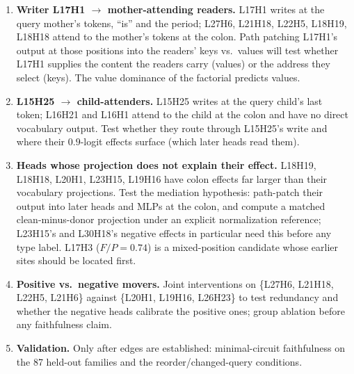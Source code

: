 \documentclass[11pt,a4paper]{article}
\begin{document}
\begin{enumerate}
\item \textbf{Writer L17H1 $\rightarrow$ mother-attending readers.} L17H1 writes at
the query mother's tokens, ``is'' and the period; L27H6, L21H18, L22H5, L18H19,
L18H18 attend to the mother's tokens at the colon. Path patching L17H1's output at
those positions into the readers' keys vs.\ values will test whether L17H1 supplies the
content the readers carry (values) or the address they select (keys). The value
dominance of the factorial predicts values.
\item \textbf{L15H25 $\rightarrow$ child-attenders.} L15H25 writes at the query child's
last token; L16H21 and L16H1 attend to the child at the colon and have no direct
vocabulary output. Test whether they route through L15H25's write and where their
$0.9$-logit effects surface (which later heads read them).
\item \textbf{Heads whose projection does not explain their effect.} L18H19, L18H18,
L20H1, L23H15, L19H16 have colon effects far larger than their vocabulary projections.
Test the mediation hypothesis: path-patch their output into later heads and MLPs at the
colon, and compute a matched clean-minus-donor projection under an explicit
normalization reference; L23H15's and L30H18's negative effects in particular need this
before any type label. L17H3 ($F/P=0.74$) is a mixed-position candidate whose earlier
sites should be located first.
\item \textbf{Positive vs.\ negative movers.} Joint interventions on \{L27H6, L21H18,
L22H5, L21H6\} against \{L20H1, L19H16, L26H23\} to test redundancy and whether the
negative heads calibrate the positive ones; group ablation before any faithfulness
claim.
\item \textbf{Validation.} Only after edges are established: minimal-circuit
faithfulness on the 87 held-out families and the reorder/changed-query conditions.
\end{enumerate}
\end{document}
